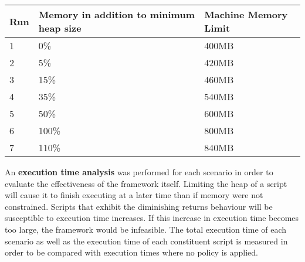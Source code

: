\documentclass{l4proj}
\begin{document}
\begin{center}
\begin{tabular}{  | l | l | l | }
\hline  
  Run & Memory in addition to minimum heap size & Machine Memory Limit \\
\hline
  1 & 0\% & 400MB \\
\hline
  2 & 5\% & 420MB \\
\hline  
  3 & 15\% & 460MB \\
\hline  
  4 & 35\% & 540MB \\
\hline  
  5 & 50\% & 600MB \\
\hline  
  6 & 100\% & 800MB \\
\hline
  7 & 110\% & 840MB \\
\hline
\end{tabular}
\end{center}
\hspace*{1em} An \textbf{execution time analysis} was performed for each scenario in order to evaluate the effectiveness of the framework itself. Limiting the heap of a script will cause it to finish executing at a later time than if memory were not constrained. Scripts that exhibit the diminishing returns behaviour will be susceptible to execution time increases. If this increase in execution time becomes too large, the framework would be infeasible. The total execution time of each scenario as well as the execution time of each constituent script is measured in order to be compared with execution times where no policy is applied.
\end{document}
